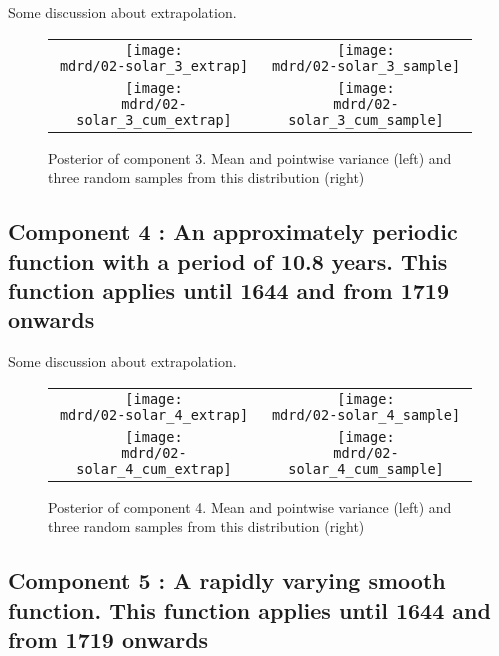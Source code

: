 \documentclass{article} %
\begin{document}
Some discussion about extrapolation.

\begin{figure}[H]
\newcommand{\wmgd}{0.5\columnwidth}
\newcommand{\hmgd}{3.0cm}
\newcommand{\mdrd}{figures/02-solar}
\newcommand{\mbm}{\hspace{-0.3cm}}
\begin{tabular}{cc}
\mbm \texttt{[image: \\mdrd/02-solar\_3\_extrap]} & \texttt{[image: \\mdrd/02-solar\_3\_sample]} \\
\mbm \texttt{[image: \\mdrd/02-solar\_3\_cum\_extrap]} & \texttt{[image: \\mdrd/02-solar\_3\_cum\_sample]}
\end{tabular}
\caption{Posterior of component 3. Mean and pointwise variance (left) and three random samples from this distribution (right)}
\label{fig:extrap3}
\end{figure}

\subsection{Component 4 : An approximately periodic function with a period of 10.8 years. This function applies until 1644 and from 1719 onwards}

Some discussion about extrapolation.

\begin{figure}[H]
\newcommand{\wmgd}{0.5\columnwidth}
\newcommand{\hmgd}{3.0cm}
\newcommand{\mdrd}{figures/02-solar}
\newcommand{\mbm}{\hspace{-0.3cm}}
\begin{tabular}{cc}
\mbm \texttt{[image: \\mdrd/02-solar\_4\_extrap]} & \texttt{[image: \\mdrd/02-solar\_4\_sample]} \\
\mbm \texttt{[image: \\mdrd/02-solar\_4\_cum\_extrap]} & \texttt{[image: \\mdrd/02-solar\_4\_cum\_sample]}
\end{tabular}
\caption{Posterior of component 4. Mean and pointwise variance (left) and three random samples from this distribution (right)}
\label{fig:extrap4}
\end{figure}

\subsection{Component 5 : A rapidly varying smooth function. This function applies until 1644 and from 1719 onwards}
\end{document}
